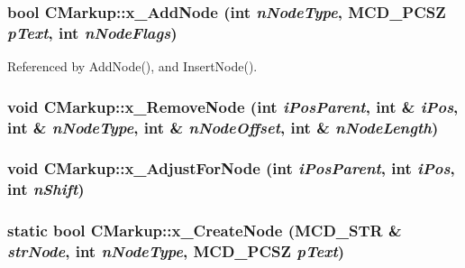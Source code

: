 \subsubsection[x\_\-AddNode]{\setlength{\rightskip}{0pt plus 5cm}bool CMarkup::x\_\-AddNode (int {\em nNodeType}, \/  MCD\_\-PCSZ {\em pText}, \/  int {\em nNodeFlags})\hspace{0.3cm}{\tt  [protected]}}\label{classCMarkup_d556122bb3c73aff12e7fb84b4318d0d}




Referenced by AddNode(), and InsertNode().
\subsubsection[x\_\-RemoveNode]{\setlength{\rightskip}{0pt plus 5cm}void CMarkup::x\_\-RemoveNode (int {\em iPosParent}, \/  int \& {\em iPos}, \/  int \& {\em nNodeType}, \/  int \& {\em nNodeOffset}, \/  int \& {\em nNodeLength})\hspace{0.3cm}{\tt  [protected]}}\label{classCMarkup_64af7284f3c7c8babdaa5248b52a0f04}


\subsubsection[x\_\-AdjustForNode]{\setlength{\rightskip}{0pt plus 5cm}void CMarkup::x\_\-AdjustForNode (int {\em iPosParent}, \/  int {\em iPos}, \/  int {\em nShift})\hspace{0.3cm}{\tt  [protected]}}\label{classCMarkup_dcdad1f2e782ce519675ceaae421da8d}


\subsubsection[x\_\-CreateNode]{\setlength{\rightskip}{0pt plus 5cm}static bool CMarkup::x\_\-CreateNode (MCD\_\-STR \& {\em strNode}, \/  int {\em nNodeType}, \/  MCD\_\-PCSZ {\em pText})\hspace{0.3cm}{\tt  [static, protected]}}\label{classCMarkup_43c780106bb839a6ba17a4f222ebc47c}


